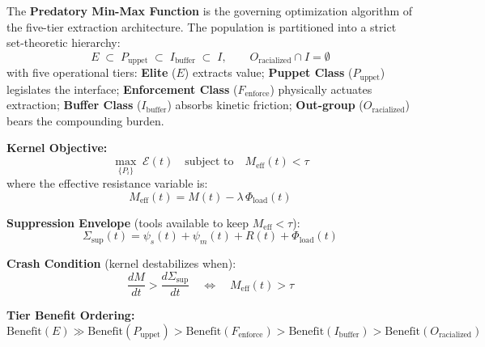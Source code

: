 \documentclass[12pt,openany]{book}
\begin{document}
\begin{definition}
The \textbf{Predatory Min-Max Function} is the governing optimization algorithm of the five-tier extraction architecture. The population is partitioned into a strict set-theoretic hierarchy:
\[
E \;\subset\; P_{\text{uppet}} \;\subset\; I_{\text{buffer}} \;\subset\; I, \qquad O_{\text{racialized}} \cap I = \emptyset
\]
with five operational tiers: \textbf{Elite} ($E$) extracts value; \textbf{Puppet Class} ($P_{\text{uppet}}$) legislates the interface; \textbf{Enforcement Class} ($F_{\text{enforce}}$) physically actuates extraction; \textbf{Buffer Class} ($I_{\text{buffer}}$) absorbs kinetic friction; \textbf{Out-group} ($O_{\text{racialized}}$) bears the compounding burden.

\textbf{Kernel Objective:}
\[
\max_{\{P_i\}}\; \mathcal{E}(t) \quad \text{subject to} \quad M_{\text{eff}}(t) < \tau
\]
where the effective resistance variable is:
\[
M_{\text{eff}}(t) = M(t) - \lambda\,\Phi_{\text{load}}(t)
\]

\textbf{Suppression Envelope} (tools available to keep $M_{\text{eff}} < \tau$):
\[
\Sigma_{\text{sup}}(t) = \psi_s(t) + \psi_m(t) + R(t) + \Phi_{\text{load}}(t)
\]

\textbf{Crash Condition} (kernel destabilizes when):
\[
\frac{dM}{dt} > \frac{d\Sigma_{\text{sup}}}{dt} \quad \Longleftrightarrow \quad M_{\text{eff}}(t) > \tau
\]

\textbf{Tier Benefit Ordering:}
\[
\text{Benefit}(E) \gg \text{Benefit}(P_{\text{uppet}}) > \text{Benefit}(F_{\text{enforce}}) > \text{Benefit}(I_{\text{buffer}}) > \text{Benefit}(O_{\text{racialized}})
\]


\end{definition}
\end{document}
